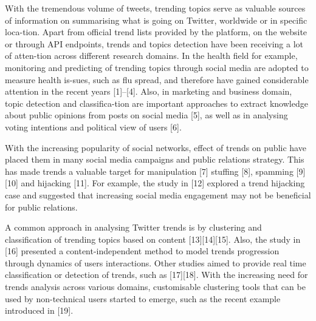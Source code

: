 \documentclass{llncs}
\begin{document}
With the tremendous volume of tweets, trending topics serve as
valuable sources of information on summarising what is going on
Twitter, worldwide or in specific loca-tion. Apart from official trend
lists provided by the platform, on the website or through API
endpoints, trends and topics detection have been receiving a lot of
atten-tion across different research domains. In the health field for
example, monitoring and predicting of trending topics through social
media are adopted to measure health is-sues, such as flu spread, and
therefore have gained considerable attention in the recent years
[1]–[4]. Also, in marketing and business domain, topic detection and
classifica-tion are important approaches to extract knowledge about
public opinions from posts on social media [5], as well as in
analysing voting intentions and political view of users [6].

With the increasing popularity of social networks, effect of trends on
public have placed them in many social media campaigns and public
relations strategy. This has made trends a valuable target for
manipulation [7] stuffing [8], spamming [9][10] and hijacking
[11]. For example, the study in [12] explored a trend hijacking case
and suggested that increasing social media engagement may not be
beneficial for public relations.

A common approach in analysing Twitter trends is by clustering and
classification of trending topics based on content [13][14][15]. Also,
the study in [16] presented a content-independent method to model
trends progression through dynamics of users interactions. Other
studies aimed to provide real time classification or detection of
trends, such as [17][18]. With the increasing need for trends analysis
across various domains, customisable clustering tools that can be used
by non-technical users started to emerge, such as the recent example
introduced in [19].






\end{document}
